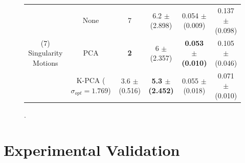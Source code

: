 \documentclass[letterpaper, 10 pt, conference,fleqn]{ieeeconf}
\begin{document}
\begin{figure}[!ht]
\begin{minipage}[b]{0.69\textwidth}
{\begin{tabular}{cc|cc|cc}
	\multicolumn{1}{c}{\multirow{3}{*}{(7) Singularity Motions}} & None & 7 & 6.2 $\pm$ (2.898) & 0.054 $\pm$ (0.009) & 0.137 $\pm$ (0.098)  \\
    \multicolumn{1}{c}{\multirow{3}{*}{($N=10,M=1467$)}} & PCA & \textbf{2} & 6 $\pm$ (2.357) & \textbf{ 0.053 $\pm$ (0.010) } & \cellcolor{blue!10} 0.105 $\pm$ (0.046) \\	
	& K-PCA ($\sigma_{opt} = 1.769$) & 3.6 $\pm$ (0.516) & \textbf{5.3 $\pm$ (2.452)} & 0.055 $\pm$ (0.018) & \cellcolor{blue!15} 0.071 $\pm$ (0.010)   \\ \hline\hline
\end{tabular}}
      .
    \end{minipage}
    \vspace{-20pt}
\end{figure}





\section{Experimental Validation} \label{Sec:Exp}
\end{document}
